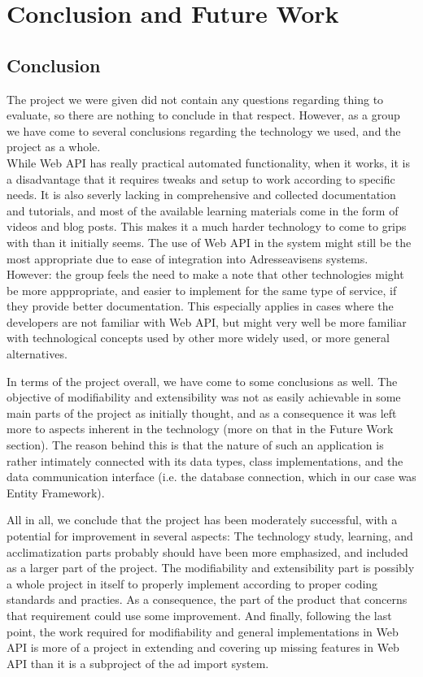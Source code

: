 \chapter{Conclusion and Future Work}

\section{Conclusion}

The project we were given did not contain any questions regarding thing to evaluate, so there are nothing to conclude in that respect. However, as a group we have come to several conclusions regarding the technology we used, and the project as a whole.
\\
While Web API has really practical automated functionality, when it works, it is a disadvantage that it requires tweaks and setup to work according to specific needs. It is also severly lacking in comprehensive and collected documentation and tutorials, and most of the available learning materials come in the form of videos and blog posts. This makes it a much harder technology to come to grips with than it initially seems. The use of Web API in the system might still be the most appropriate due to ease of integration into Adresseavisens systems. However: the group feels the need to make a note that other technologies might be more apppropriate, and easier to implement for the same type of service, if they provide better documentation. This especially applies in cases where the developers are not familiar with Web API, but might very well be more familiar with technological concepts used by other more widely used, or more general alternatives.

In terms of the project overall, we have come to some conclusions as well. The objective of modifiability and extensibility was not as easily achievable in some main parts of the project as initially thought, and as a consequence it was left more to aspects inherent in the technology (more on that in the Future Work section). The reason behind this is that the nature of such an application is rather intimately connected with its data types, class implementations, and the data communication interface (i.e. the database connection, which in our case was Entity Framework).

All in all, we conclude that the project has been moderately successful, with a potential for improvement in several aspects: The technology study, learning, and acclimatization parts probably should have been more emphasized, and included as a larger part of the project. The modifiability and extensibility part is possibly a whole project in itself to properly implement according to proper coding standards and practies. As a consequence, the part of the product that concerns that requirement could use some improvement. And finally, following the last point, the work required for modifiability and general implementations in Web API is more of a project in extending and covering up missing features in Web API than it is a subproject of the ad import system. 

